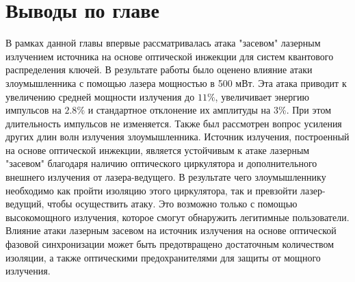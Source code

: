 \section{Выводы по главе}\label{ch:ch5/sect5}
В рамках данной главы впервые рассматривалась атака "засевом" лазерным излучением источника на основе оптической инжекции для систем квантового распределения ключей. В результате работы было оценено влияние атаки злоумышленника с помощью лазера мощностью в 500 мВт. 
Эта атака приводит к увеличению средней мощности излучения до $11\%$, увеличивает энергию импульсов на $2.8\%$ и стандартное отклонение их амплитуды на 3\%. При этом длительность импульсов не изменяется.
Также был рассмотрен вопрос усиления других длин волн излучения злоумышленника. Источник излучения, построенный на основе оптической инжекции, является устойчивым к атаке лазерным "засевом" благодаря наличию оптического циркулятора и дополнительного внешнего излучения от лазера-ведущего.
В результате чего злоумышленнику необходимо как пройти изоляцию этого циркулятора, так и превзойти лазер-ведущий, чтобы осуществить атаку. Это возможно только с помощью высокомощного излучения, которое смогут обнаружить легитимные пользователи.
\newline Влияние атаки лазерным засевом на источник излучения на основе оптической фазовой синхронизации может быть предотвращено достаточным количеством изоляции, а также оптическими предохранителями для защиты от мощного излучения.